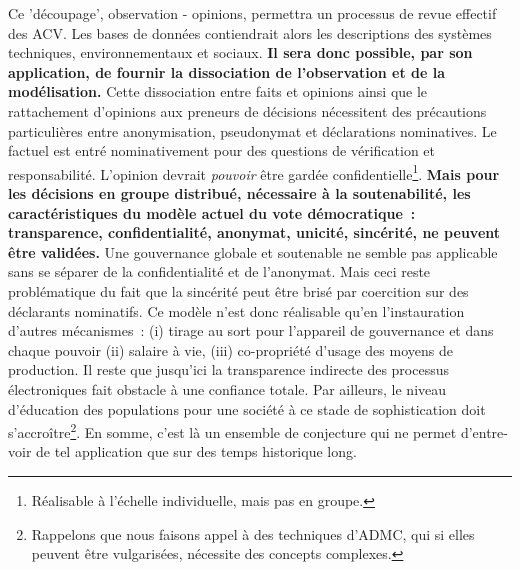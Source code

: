 Ce 'découpage', observation - opinions, permettra un processus de revue effectif des ACV.
Les bases de données contiendrait alors les descriptions des systèmes techniques, environnementaux et sociaux.
\textbf{Il sera donc possible, par son application, de fournir la dissociation de l'observation et de la modélisation.}
Cette dissociation entre faits et opinions ainsi que le rattachement d'opinions aux preneurs de décisions nécessitent des précautions particulières entre anonymisation, pseudonymat et déclarations nominatives.
Le factuel est entré nominativement pour des questions de  vérification et responsabilité.
L'opinion devrait \textit{pouvoir} être gardée confidentielle\footnote{Réalisable à l’échelle individuelle, mais pas en groupe.}.
\textbf{Mais pour les décisions en groupe distribué, nécessaire à la soutenabilité, les caractéristiques du modèle actuel du vote démocratique~: transparence, confidentialité, anonymat, unicité, sincérité, ne peuvent être validées.}%
Une gouvernance globale et soutenable ne semble pas applicable sans se séparer de la confidentialité et de l'anonymat.
Mais ceci reste problématique du fait que la sincérité peut être brisé par coercition sur des déclarants nominatifs.
Ce modèle n'est donc réalisable qu'en l'instauration d'autres mécanismes~: (i) tirage au sort pour l'appareil de gouvernance et dans chaque pouvoir (ii) salaire à vie, (iii) co-propriété d'usage des moyens de production.
Il reste que jusqu'ici la transparence indirecte des processus électroniques fait obstacle à une confiance totale.
Par ailleurs, le niveau d'éducation des populations pour une société à ce stade de sophistication doit s’accroître\footnote{Rappelons que nous faisons appel à des techniques d'\gls{ADMC}, qui si elles peuvent être vulgarisées, nécessite des concepts complexes.}.
En somme, c'est là un ensemble de conjecture qui ne permet d'entre-voir de tel application que sur des temps historique long.

